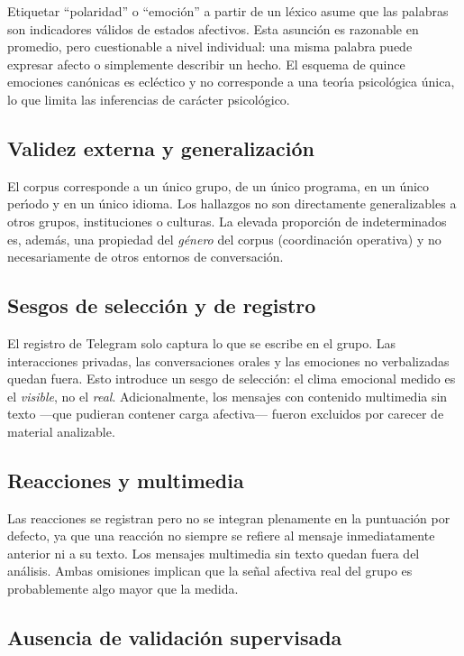 Etiquetar ``polaridad'' o ``emoci\'on'' a partir de un l\'exico asume que las palabras
son indicadores v\'alidos de estados afectivos. Esta asunci\'on es razonable en promedio,
pero cuestionable a nivel individual: una misma palabra puede expresar afecto o
simplemente describir un hecho. El esquema de quince emociones canónicas es ecl\'ectico y no
corresponde a una teor\'\i{}a psicol\'ogica \'unica, lo que limita las inferencias de
car\'acter psicol\'ogico.

\subsection{Validez externa y generalizaci\'on}

El corpus corresponde a un \'unico grupo, de un \'unico programa, en un \'unico per\'\i{}odo
y en un \'unico idioma. Los hallazgos no son directamente generalizables a otros grupos,
instituciones o culturas. La elevada proporci\'on de indeterminados es, adem\'as, una
propiedad del \emph{g\'enero} del corpus (coordinaci\'on operativa) y no necesariamente
de otros entornos de conversaci\'on.

\subsection{Sesgos de selecci\'on y de registro}

El registro de Telegram solo captura lo que se escribe en el grupo. Las interacciones
privadas, las conversaciones orales y las emociones no verbalizadas quedan fuera. Esto
introduce un sesgo de selecci\'on: el clima emocional medido es el \emph{visible}, no el
\emph{real}. Adicionalmente, los mensajes con contenido multimedia sin texto ---que
pudieran contener carga afectiva--- fueron excluidos por carecer de material analizable.

\subsection{Reacciones y multimedia}

Las reacciones se registran pero no se integran plenamente en la puntuaci\'on por
defecto, ya que una reacción no siempre se refiere al mensaje inmediatamente anterior ni
a su texto. Los mensajes multimedia sin texto quedan fuera del an\'alisis. Ambas
omisiones implican que la se\~nal afectiva real del grupo es probablemente algo mayor que
la medida.

\subsection{Ausencia de validaci\'on supervisada}

